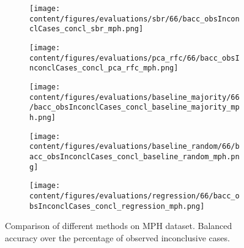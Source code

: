 \begin{figure}[ht]
  \begin{subfigure}{0.45\textwidth}
    \centering
    \texttt{[image: content/figures/evaluations/sbr/66/bacc\_obsInconclCases\_concl\_sbr\_mph.png]}
  \end{subfigure}
  \hfill
  \begin{subfigure}{0.45\textwidth}
    \centering
    \texttt{[image: content/figures/evaluations/pca\_rfc/66/bacc\_obsInconclCases\_concl\_pca\_rfc\_mph.png]}
  \end{subfigure}
  \hfill
  \begin{subfigure}{0.45\textwidth}
    \centering
    \texttt{[image: content/figures/evaluations/baseline\_majority/66/bacc\_obsInconclCases\_concl\_baseline\_majority\_mph.png]}
  \end{subfigure}
  \hfill
  \begin{subfigure}{0.45\textwidth}
    \centering
    \texttt{[image: content/figures/evaluations/baseline\_random/66/bacc\_obsInconclCases\_concl\_baseline\_random\_mph.png]}
  \end{subfigure}
  \hfill
  \begin{subfigure}{0.45\textwidth}
    \centering
    \texttt{[image: content/figures/evaluations/regression/66/bacc\_obsInconclCases\_concl\_regression\_mph.png]}
  \end{subfigure}

  \caption{Comparison of different methods on MPH dataset.
  Balanced accuracy over the percentage of observed inconclusive cases.}
  \label{fig:test_mph}
\end{figure}


